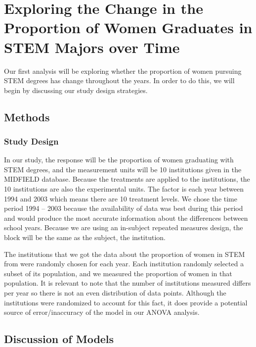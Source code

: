 \documentclass[]{article}
\begin{document}
\section{Exploring the Change in the Proportion of Women Graduates in
STEM Majors over
Time}\label{exploring-the-change-in-the-proportion-of-women-graduates-in-stem-majors-over-time}

Our first analysis will be exploring whether the proportion of women
pursuing STEM degrees has change throughout the years. In order to do
this, we will begin by discussing our study design strategies.

\subsection{Methods}\label{methods}

\subsubsection{Study Design}\label{study-design}

In our study, the response will be the proportion of women graduating
with STEM degrees, and the measurement units will be 10 institutions
given in the MIDFIELD database. Because the treatments are applied to
the institutions, the 10 institutions are also the experimental units.
The factor is each year between 1994 and 2003 which means there are 10
treatment levels. We chose the time period 1994 -- 2003 because the
availability of data was best during this period and would produce the
most accurate information about the differences between school years.
Because we are using an in-subject repeated measures design, the block
will be the same as the subject, the institution.

The institutions that we got the data about the proportion of women in
STEM from were randomly chosen for each year. Each institution randomly
selected a subset of its population, and we measured the proportion of
women in that population. It is relevant to note that the number of
institutions measured differs per year so there is not an even
distribution of data points. Although the institutions were randomized
to account for this fact, it does provide a potential source of
error/inaccuracy of the model in our ANOVA analysis.

\subsection{Discussion of Models}\label{discussion-of-models}
\end{document}

